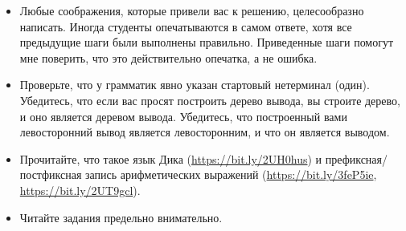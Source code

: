 \documentclass[12pt]{article}
\begin{document}
\begin{itemize}
  \item Любые соображения, которые привели вас к решению, целесообразно написать. Иногда студенты опечатываются в самом ответе, хотя все предыдущие шаги были выполнены правильно. Приведенные шаги помогут мне поверить, что это действительно опечатка, а не ошибка.
  \item Проверьте, что у грамматик явно указан стартовый нетерминал (один). Убедитесь, что если вас просят построить дерево вывода, вы строите дерево, и оно является деревом вывода. Убедитесь, что построенный вами левосторонний вывод является левосторонним, и что он является выводом.
  \item Прочитайте, что такое язык Дика (\url{https://bit.ly/2UH0hus}) и префиксная/постфиксная запись арифметических выражений (\url{https://bit.ly/3feP5ie}, \url{https://bit.ly/2UT9gcl}).
  \item Читайте задания предельно внимательно.
\end{itemize}

\newpage
\end{document}
